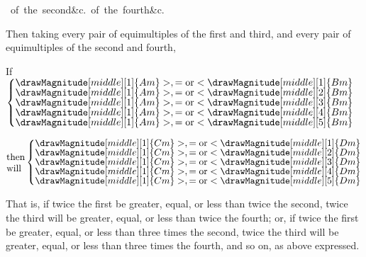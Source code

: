 \documentclass[booklanguage=english]{byrnebook}
\begin{document}
\sepSpace

\vbox{\hfill\hbox{
\vbox{\hbox{of the second}\hbox{}\hbox{\&c.}}
\vbox{\hbox{of the fourth}\hbox{}\hbox{\&c.}}
}\hfill\ }

\sepSpace

Then taking every pair of equimultiples of the first and third, and every pair of equimultiples of the second and fourth,

\begin{center}
If
$\left\{\vcenter{
\nointerlineskip\hbox{$\drawMagnitude[middle][1]{Am} >, = \mbox{or} < \drawMagnitude[middle][1]{Bm}$}
\nointerlineskip\hbox{$\drawMagnitude[middle][1]{Am} >, = \mbox{or} < \drawMagnitude[middle][2]{Bm}$}
\nointerlineskip\hbox{$\drawMagnitude[middle][1]{Am} >, = \mbox{or} < \drawMagnitude[middle][3]{Bm}$}
\nointerlineskip\hbox{$\drawMagnitude[middle][1]{Am} >, = \mbox{or} < \drawMagnitude[middle][4]{Bm}$}
\nointerlineskip\hbox{$\drawMagnitude[middle][1]{Am} >, = \mbox{or} < \drawMagnitude[middle][5]{Bm}$}
}\right.$

$\vcenter{\hbox{then}\hbox{will}}\left\{\vcenter{
\nointerlineskip\hbox{$\drawMagnitude[middle][1]{Cm} >, = \mbox{or} < \drawMagnitude[middle][1]{Dm}$}
\nointerlineskip\hbox{$\drawMagnitude[middle][1]{Cm} >, = \mbox{or} < \drawMagnitude[middle][2]{Dm}$}
\nointerlineskip\hbox{$\drawMagnitude[middle][1]{Cm} >, = \mbox{or} < \drawMagnitude[middle][3]{Dm}$}
\nointerlineskip\hbox{$\drawMagnitude[middle][1]{Cm} >, = \mbox{or} < \drawMagnitude[middle][4]{Dm}$}
\nointerlineskip\hbox{$\drawMagnitude[middle][1]{Cm} >, = \mbox{or} < \drawMagnitude[middle][5]{Dm}$}
}\right.$
\end{center}

That is, if twice the first be greater, equal, or less than twice the second, twice the third will be greater, equal, or less than twice the fourth; or, if twice the first be greater, equal, or less than three times the second, twice the third will be greater, equal, or less than three times the fourth, and so on, as above expressed.
\end{document}
